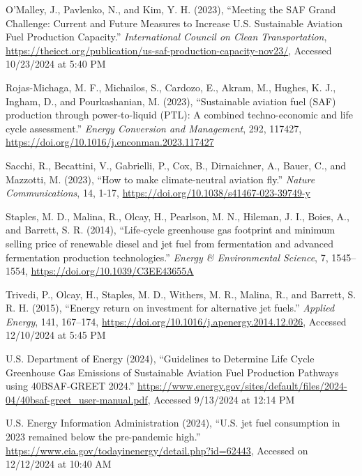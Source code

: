 \documentclass[12pt]{article}
\begin{document}
\begin{description}
    \item O’Malley, J., Pavlenko, N., and Kim, Y. H. (2023), “Meeting the SAF Grand Challenge: Current and Future Measures to Increase U.S. Sustainable Aviation Fuel Production Capacity.” \textit{International Council on Clean Transportation}, \url{https://theicct.org/publication/us-saf-production-capacity-nov23/}, Accessed 10/23/2024 at 5:40 PM
    
    \item Rojas-Michaga, M. F., Michailos, S., Cardozo, E., Akram, M., Hughes, K. J., Ingham, D., and Pourkashanian, M. (2023), “Sustainable aviation fuel (SAF) production through power-to-liquid (PTL): A combined techno-economic and life cycle assessment.” \textit{Energy Conversion and Management}, 292, 117427, \url{https://doi.org/10.1016/j.enconman.2023.117427}
    
    \item Sacchi, R., Becattini, V., Gabrielli, P., Cox, B., Dirnaichner, A., Bauer, C., and Mazzotti, M. (2023), “How to make climate-neutral aviation fly.” \textit{Nature Communications}, 14, 1-17, \url{https://doi.org/10.1038/s41467-023-39749-y}
    
    \item Staples, M. D., Malina, R., Olcay, H., Pearlson, M. N., Hileman, J. I., Boies, A., and Barrett, S. R. (2014), “Life-cycle greenhouse gas footprint and minimum selling price of renewable diesel and jet fuel from fermentation and advanced fermentation production technologies.” \textit{Energy \& Environmental Science}, 7, 1545–1554, \url{https://doi.org/10.1039/C3EE43655A}
    
    \item Trivedi, P., Olcay, H., Staples, M. D., Withers, M. R., Malina, R., and Barrett, S. R. H. (2015), “Energy return on investment for alternative jet fuels.” \textit{Applied Energy}, 141, 167–174, \url{https://doi.org/10.1016/j.apenergy.2014.12.026}, Accessed 12/10/2024 at 5:45 PM
    
    \item U.S. Department of Energy (2024), “Guidelines to Determine Life Cycle Greenhouse Gas Emissions of Sustainable Aviation Fuel Production Pathways using 40BSAF-GREET 2024.” \url{https://www.energy.gov/sites/default/files/2024-04/40bsaf-greet_user-manual.pdf}, Accessed 9/13/2024 at 12:14 PM
    
    \item U.S. Energy Information Administration (2024), “U.S. jet fuel consumption in 2023 remained below the pre-pandemic high.” \url{https://www.eia.gov/todayinenergy/detail.php?id=62443}, Accessed on 12/12/2024 at 10:40 AM
    

\end{description}
\end{document}
